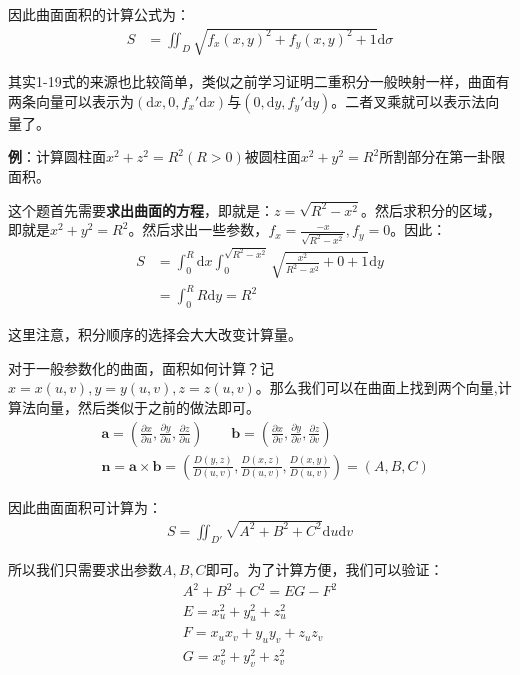 \documentclass{ctexart}
\let\oldtextbf\textbf
\renewcommand{\textbf}[1]{\textcolor{brown!50!red}{\oldtextbf{#1}}}
\begin{document}
\begin{tcolorbox}[
    colback=bac1,     %
    colframe=fra1,   %
    coltitle=white,             %
    coltext=tex1,
    title=Cauchy柯西不等式,
    fonttitle=\bfseries,        %
arc=3mm,                     %
breakable
]
因此曲面面积的计算公式为：
\begin{align*}
S&=\iint_D{\sqrt{f_x(x,y)^2+f_y(x,y)^2+1}}\mathrm{d}\sigma\tag{1-20} 
\end{align*}
\end{tcolorbox}
其实1-19式的来源也比较简单，类似之前学习证明二重积分一般映射一样，曲面有两条向量可以表示为$(\mathrm{d}x,0,f_x'\mathrm{d}x)$与$(0,\mathrm{d}y,f_y'\mathrm{d}y)$。二者叉乘就可以表示法向量了。

\textbf{\color{brown!50!red}例}：计算圆柱面$x^2+z^2=R^2(R>0)$被圆柱面$x^2+y^2=R^2$所割部分在第一卦限面积。

这个题首先需要\textbf{\color{brown!50!red}求出曲面的方程}，即就是：$z=\sqrt{R^2-x^2}$。然后求积分的区域，即就是$x^2+y^2=R^2$。然后求出一些参数，$f_x=\frac{-x}{\sqrt{R^2-x^2}},f_y=0$。因此：
\begin{align*}
    S&=\int_0^R\mathrm{d}x\int_0^{\sqrt{R^2-x^2} }\sqrt{\frac{x^2}{R^2-x^2}+0+1 }\mathrm{d}y
\\&=\int_0^R R\mathrm{d}y=R^2  
\end{align*}

这里注意，积分顺序的选择会大大改变计算量。

对于一般参数化的曲面，面积如何计算？记$x=x(u,v),y=y(u,v),z=z(u,v)$。那么我们可以在曲面上找到两个向量,计算法向量，然后类似于之前的做法即可。
\begin{align*}
 &\bm{a}  =(\frac{\partial x}{\partial  u},\frac{\partial y}{\partial  u},\frac{\partial z}{\partial  u})
\qquad  
\bm{b}  =(\frac{\partial x}{\partial  v},\frac{\partial y}{\partial  v},\frac{\partial z}{\partial  v})
\\
&\bm{n} =\bm{a} \times \bm{b} =(\frac{D(y,z)}{D(u,v)},\frac{D(x,z)}{D(u,v)},\frac{D(x,y)}{D(u,v)})
=(A,B,C)\tag{1-21}
\end{align*}
\begin{tcolorbox}[
    colback=bac1,     %
    colframe=fra1,   %
    coltitle=white,             %
    coltext=tex1,
    title=曲面面积的参数方程法则,
    fonttitle=\bfseries,        %
arc=3mm,                     %
breakable
]
因此曲面面积可计算为：
\begin{align*}
    S=\iint_{D'}\sqrt{A^2+B^2+C^2}\mathrm{d}u\mathrm{d}v\tag{1-22}
\end{align*}

所以我们只需要求出参数$A,B,C$即可。为了计算方便，我们可以验证：
\begin{align*}
A^2+B^2+C^2=EG-F^2\tag{1-23}\\
E=x_u^2+y_u^2+z_u^2\\
F=x_ux_v+y_uy_v+z_uz_v\\
G=x_v^2+y_v^2+z_v^2
\end{align*}
\end{tcolorbox}
\end{document}
